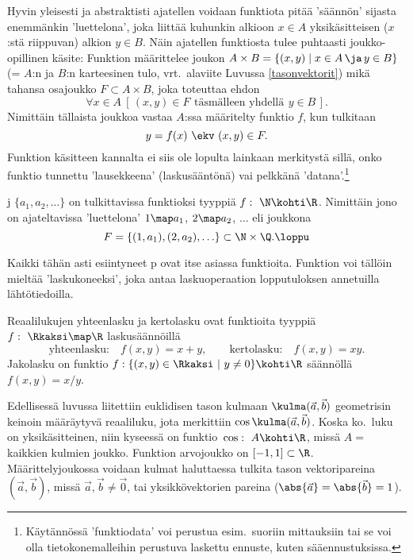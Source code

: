 Hyvin yleisesti ja abstraktisti ajatellen voidaan funktiota pitää 'säännön' sijasta enemmänkin
'luettelona', joka liittää kuhunkin alkioon $x \in A$ yksikäsitteisen ($x$:stä riippuvan)
alkion $y \in B$. Näin ajatellen funktiosta tulee puhtaasti joukko-opillinen käsite: Funktion
määrittelee joukon $A \times B = \{(x,y) \mid x \in A\, \ja\, y \in B\}$ (= $A$:n ja $B$:n
karteesinen tulo, vrt.\ alaviite Luvussa \ref{tasonvektorit}) mikä tahansa osajoukko
$F \subset A \times B$, joka toteuttaa ehdon
\[
\forall x \in A\ [\,(x,y) \in F\,\ \text{täsmälleen yhdellä}\,\ y \in B\,].
\]
Nimittäin tällaista joukkoa vastaa $A$:ssa määritelty funktio $f$, kun tulkitaan
\[
y=f(x)\ \ekv\ (x,y) \in F.
\]
Funktion käsitteen kannalta ei siis ole lopulta lainkaan merkitystä sillä, onko funktio
tunnettu 'lausekkeena' (laskusääntönä) vai pelkkänä 'datana'.\footnote[2]{Käytännössä
'funktiodata' voi perustua esim.\ suoriin mittauksiin tai se voi olla tietokonemalleihin
perustuva laskettu ennuste, kuten sääennustuksissa.} 
\begin{Exa} j $\{a_1, a_2, \ldots\}$ on tulkittavissa funktioksi
tyyppiä $f: \ \N\kohti\R$. Nimittäin jono on ajateltavissa 'luettelona' $1 \map a_1$, 
$2 \map a_2$, $\ldots$ eli joukkona
\[
F= \{ (1,a_1), (2,a_2),\ldots \} \subset \N \times \Q. \loppu
\]
\end{Exa}
Kaikki tähän asti esiintyneet p ovat itse asiassa funktioita. 
Funktion voi tällöin mieltää 'laskukoneeksi', joka antaa laskuoperaation lopputuloksen
annetuilla lähtötiedoilla.
\begin{Exa}
Reaalilukujen yhteenlasku ja kertolasku ovat funktioita tyyppiä $f:\ \Rkaksi \map \R$ 
laskusäännöillä
\[
\text{yhteenlasku:} \quad f(x,y)=x+y, \qquad \text{kertolasku:} \quad f(x,y)=xy.
\]
Jakolasku on funktio $f: \{(x,y) \in \Rkaksi \ | \ y \neq 0 \} \kohti \R$ säännöllä
$f(x,y)=x/y$. \loppu
\end{Exa}
\begin{Exa} \label{skalaaritulo funktiona} Edellisessä luvussa liitettiin euklidisen tason
kulmaan $\kulma(\vec a,\vec b)$ geometrisin keinoin määräytyvä reaaliluku, jota merkittiin 
$\cos\kulma(\vec a,\vec b)$. Koska ko.\ luku on yksikäsitteinen, niin kyseessä on funktio 
$\,\cos:\ A \kohti \R$, missä $A=$ kaikkien kulmien joukko. Funktion arvojoukko on 
$[-1,1]\subset\R$. Määrittelyjoukossa voidaan kulmat haluttaessa tulkita tason vektoripareina
$(\vec a,\vec b)$, missä $\vec a,\vec b \neq \vec 0$, tai yksikkövektorien pareina 
($\abs{\vec a}=\abs{\vec b}=1$).  \loppu
\end{Exa}

